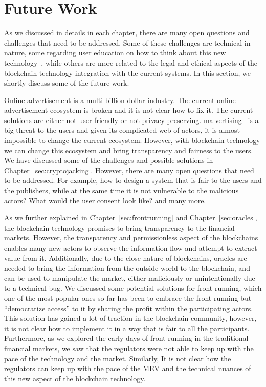 \section{Future Work}
As we discussed in details in each chapter, there are many open questions and challenges that need to be addressed. Some of these challenges are technical in nature, some regarding user education on how to think about this new technology~\cite{gaggioli2019middleman}, while others are more related to the legal and ethical aspects of the blockchain technology integration with the current systems. In this section, we shortly discuss some of the future work.

Online advertisement is a multi-billion dollar industry. The current online advertisement ecosystem is broken and it is not clear how to fix it. The current solutions are either not user-friendly or not privacy-preserving. malvertising~\cite{li2012knowing} is a big threat to the users and given its complicated web of actors, it is almost impossible to change the current ecosystem. However, with blockchain technology we can change this ecosystem and bring transparency and fairness to the users. We have discussed some of the challenges and possible solutions in Chapter~\ref{sec:cryptojacking}. However, there are many open questions that need to be addressed. For example, how to design a system that is fair to the users and the publishers, while at the same time it is not vulnerable to the malicious actors? What would the user consent look like? and many more.

As we further explained in Chapter~\ref{sec:frontrunning} and Chapter~\ref{sec:oracles}, the blockchain technology promises to bring transparency to the financial markets. However, the transparency and permissionless aspect of the blockchains enables many new actors to observe the information flow and attempt to extract value from it. Additionally, due to the close nature of blockchains, oracles are needed to bring the information from the outside world to the blockchain, and can be used to manipulate the market, either maliciously or unintentionally due to a technical bug. We discussed some potential solutions for front-running, which one of the most popular ones so far has been to embrace the front-running but ``democratize access'' to it by sharing the profit within the participating actors. This solution has gained a lot of traction in the blockchain community, however, it is not clear how to implement it in a way that is fair to all the participants. Furthermore, as we explored the early days of front-running in the traditional financial markets, we saw that the regulators were not able to keep up with the pace of the technology and the market. Similarly, It is not clear how the regulators can keep up with the pace of the MEV and the technical nuances of this new aspect of the blockchain technology.


